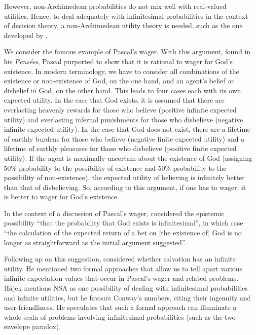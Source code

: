 However, non-Archimedean probabilities do not mix well with real-valued utilities. Hence, to deal adequately with infinitesimal probabilities in the context of decision theory, a non-Archimedean utility theory is needed, such as the one developed by \citet{Pivato:2014}.

We consider the famous example of Pascal's wager. With this argument, found in his \textit{Pens{\'e}es}, Pascal purported to show that it is rational to wager for God's existence. In modern terminology, we have to consider all combinations of the existence or non-existence of God, on the one hand, and an agent's belief or disbelief in God, on the other hand. This leads to four cases each with its own expected utility. In the case that God exists, it is assumed that there are everlasting heavenly rewards for those who believe (positive infinite expected utility) and everlasting infernal punishments for those who disbelieve (negative infinite expected utility). In the case that God does not exist, there are a lifetime of earthly burdens for those who believe (negative finite expected utility) and a lifetime of earthly pleasures for those who disbelieve (positive finite expected utility). If the agent is maximally uncertain about the existence of God (assigning 50\% probability to the possibility of existence and 50\% probability to the possibility of non-existence), the expected utility of believing is infinitely better than that of disbelieving. So, according to this argument, if one has to wager, it is better to wager for God's existence.

In the context of a discussion of Pascal's wager, \citet[p.~163]{Oppy:1990} considered the epistemic possibility ``that the probability that God exists is infinitesimal'', in which case ``the calculation of the expected return of a bet on [the existence of] God is no longer as straightforward as the initial argument suggested''.

Following up on this suggestion, \citet{Hajek:2003b} considered whether salvation has an infinite utility. He mentioned two formal approaches that allow us to tell apart various infinite expectation values that occur in Pascal's wager and related problems. H\'ajek mentions NSA as one possibility of dealing with infinitesimal probabilities and infinite utilities, but he favours Conway's numbers, citing their ingenuity and user-friendliness. He speculates that such a formal approach can illuminate a whole scala of problems involving infinitesimal probabilities (such as the two envelope paradox).


